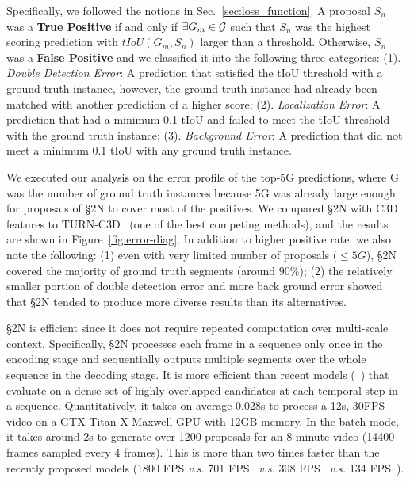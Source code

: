 \documentclass[10pt,journal,compsoc]{IEEEtran}
\begin{document}
Specifically, we followed the notions in Sec.~\ref{sec:loss_function}. A proposal $S_n$ was a \textbf{True Positive} if and only if $\exists G_m \in \mathcal{G}$ such that $S_n$ was the highest scoring prediction with $tIoU(G_m, S_n)$ larger than a threshold. Otherwise, $S_n$ was a \textbf{False Positive} and we classified it into the following three categories: (1). \textit{Double Detection Error}: A prediction that satisfied the tIoU threshold with a ground truth instance, however, the ground truth instance had already been matched with another prediction of a higher score; (2). \textit{Localization Error}: A prediction that had a minimum 0.1 tIoU and failed to meet the tIoU threshold with the ground truth instance; (3). \textit{Background Error}: A prediction that did not meet a minimum 0.1 tIoU with any ground truth instance.

We executed our analysis on the error profile of the top-5G predictions, where G was the number of ground truth instances because 5G was already large enough for proposals of \S2N to cover most of the positives. We compared \S2N with C3D features to TURN-C3D~\cite{Gao_2017_ICCV} (one of the best competing methods), and the results are shown in Figure~\ref{fig:error-diag}. In addition to higher positive rate, we also note the following: (1) even with very limited number of proposals ($\leq 5G$), \S2N covered the majority of ground truth segments (around $90\%$); (2) the relatively smaller portion of double detection error and more back ground error showed that \S2N tended to produce more diverse results than its alternatives. 

 \S2N is  efficient since it does not require repeated computation over multi-scale context. Specifically,  \S2N processes each frame in a sequence only once in the encoding stage and sequentially outputs multiple segments over the whole sequence in the decoding stage. It is more efficient than recent models (~\cite{buch2017sst,buch2017end}) that evaluate on a dense set of highly-overlapped candidates at each temporal step in a sequence. Quantitatively, it takes on average 0.028s to process a 12s, 30FPS video on a GTX Titan X Maxwell GPU with 12GB memory. In the batch mode,  it takes  around 2s to generate over 1200 proposals for an 8-minute video (14400 frames sampled every 4 frames). This is more than two times faster than the recently proposed models (1800 FPS \emph{v.s.} 701 FPS~\cite{buch2017end} \emph{v.s.} 308 FPS~\cite{buch2017sst} \emph{v.s.} 134 FPS~\cite{escorcia2016daps}).
\end{document}
